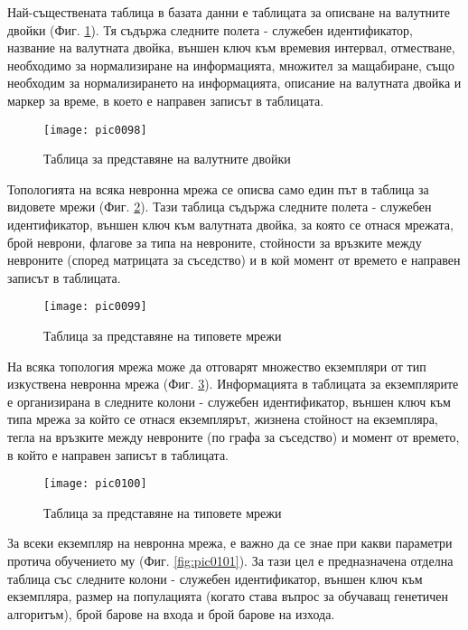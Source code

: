 Най-съществената таблица в базата данни е таблицата за описване на валутните двойки (Фиг. \ref{fig:pic0098}). Тя съдържа следните полета - служебен идентификатор, название на валутната двойка, външен ключ към времевия интервал, отместване, необходимо за нормализиране на информацията, множител за мащабиране, също необходим за нормализирането на информацията, описание на валутната двойка и маркер за време, в което е направен записът в таблицата. 

\begin{figure}[h]
  \centering
  \texttt{[image: pic0098]}
  \caption{Таблица за представяне на валутните двойки}
\label{fig:pic0098}
\end{figure}
\FloatBarrier

Топологията на всяка невронна мрежа се описва само един път в таблица за видовете мрежи (Фиг. \ref{fig:pic0099}). Тази таблица съдържа следните полета - служебен идентификатор, външен ключ към валутната двойка, за която се отнася мрежата, брой неврони, флагове за типа на невроните, стойности за връзките между невроните (според матрицата за съседство) и в кой момент от времето е направен записът в таблицата. 

\begin{figure}[h]
  \centering
  \texttt{[image: pic0099]}
  \caption{Таблица за представяне на типовете мрежи}
\label{fig:pic0099}
\end{figure}
\FloatBarrier

На всяка топология мрежа може да отговарят множество екземпляри от тип изкуствена невронна мрежа (Фиг. \ref{fig:pic0100}). Информацията в таблицата за екземплярите е организирана в следните колони - служебен идентификатор, външен ключ към типа мрежа за който се отнася екземплярът, жизнена стойност на екземпляра, тегла на връзките между невроните (по графа за съседство) и момент от времето, в който е направен записът в таблицата. 

\begin{figure}[h]
  \centering
  \texttt{[image: pic0100]}
  \caption{Таблица за представяне на типовете мрежи}
\label{fig:pic0100}
\end{figure}
\FloatBarrier

За всеки екземпляр на невронна мрежа, е важно да се знае при какви параметри протича обучението му (Фиг. \ref{fig:pic0101}). За тази цел е предназначена отделна таблица със следните колони - служебен идентификатор, външен ключ към екземпляра, размер на популацията (когато става въпрос за обучаващ генетичен алгоритъм), брой барове на входа и брой барове на изхода.

